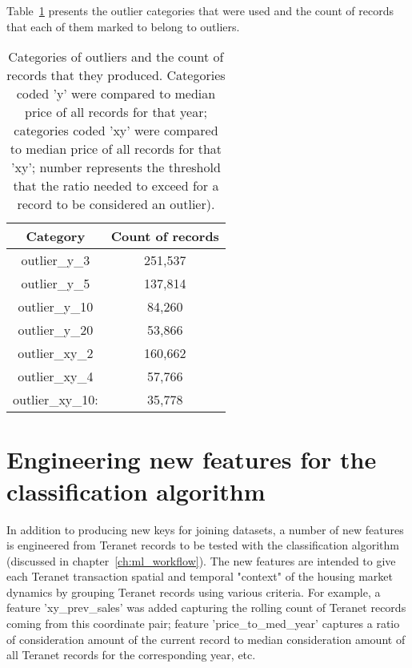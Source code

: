 \vspace{5mm}

Table~\ref{tab:outliers} presents the outlier categories that were used and the count of records that each of them marked to belong to outliers.

\begin{table}[h!]
    \centering
    \begin{tabular}{|| c | c ||}
        \hline
        Category & Count of records \\
        \hline
        \hline
        outlier\_y\_3 & 251,537 \\
        \hline
        outlier\_y\_5 & 137,814 \\
        \hline
        outlier\_y\_10 & 84,260 \\
        \hline
        outlier\_y\_20 & 53,866 \\
        \hline
        outlier\_xy\_2 & 160,662 \\
        \hline
        outlier\_xy\_4 & 57,766 \\
        \hline
        outlier\_xy\_10: & 35,778 \\
        \hline
    \end{tabular}
    \caption{Categories of outliers and the count of records that they produced.
    Categories coded 'y' were compared to median price of all records for that year;
    categories coded 'xy' were compared to median price of all records for that 'xy';
    number represents the threshold that the ratio needed to exceed for a record to be considered an outlier).}
    \label{tab:outliers}

\end{table}

\section{Engineering new features for the classification algorithm} \label{sec:feature_engineering}

In addition to producing new keys for joining datasets, a number of new features is engineered from Teranet records to be tested with the classification algorithm (discussed in chapter~\ref{ch:ml_workflow}).
The new features are intended to give each Teranet transaction spatial and temporal "context" of the housing market dynamics by grouping Teranet records using various criteria.
For example, a feature 'xy\_prev\_sales' was added capturing the rolling count of Teranet records coming from this coordinate pair;
feature 'price\_to\_med\_year' captures a ratio of consideration amount of the current record to median consideration amount of all Teranet records for the corresponding year, etc.

